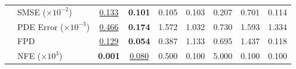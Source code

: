 \documentclass{article}
\theoremstyle{plain}
\theoremstyle{definition}
\theoremstyle{remark}
\begin{document}
\begin{table}[t]
\begin{tabular}{ll
                S  S  S  S  S  S  S}
  & SMSE ($\times 10^{-2}$) &
    {\underline{0.133}} & {\bfseries 0.101} & {0.105} & {0.103} & {0.207} & {0.701} & {0.114} \\
  & PDE Error ($\times 10^{-3}$) &
    {\underline{0.466}} & {\bfseries 0.174} & {1.572} & {1.032} & {0.730} & {1.593} & {1.334} \\
  & FPD  &
    {\underline{0.129}} & {\bfseries 0.054} & {0.387} & {1.133} & {0.695} & {1.437} & {0.118} \\
  & NFE ($\times 10^{3}$) &
    {\bfseries 0.001} & {\underline{0.080}} & {0.500} & {0.100} & {5.000} & {0.100} & {0.100} \\
\bottomrule
\end{tabular}
\end{table}
\end{document}
